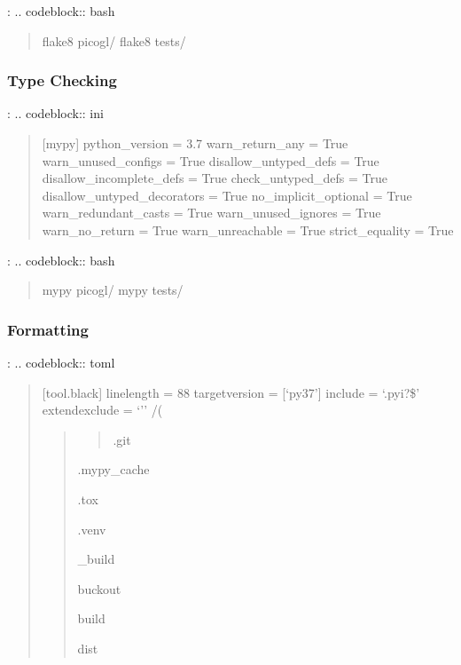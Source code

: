 \documentclass[a4paper,10pt,english,openany,oneside]{sphinxmanual}
\begin{document}
\sphinxAtStartPar
{}:
.. code\sphinxhyphen{}block:: bash
\begin{quote}

\sphinxAtStartPar
flake8 picogl/
flake8 tests/
\end{quote}


\subsubsection{Type Checking}
\label{\detokenize{testing:type-checking}}
\sphinxAtStartPar
{}:
.. code\sphinxhyphen{}block:: ini
\begin{quote}

\sphinxAtStartPar
{[}mypy{]}
python\_version = 3.7
warn\_return\_any = True
warn\_unused\_configs = True
disallow\_untyped\_defs = True
disallow\_incomplete\_defs = True
check\_untyped\_defs = True
disallow\_untyped\_decorators = True
no\_implicit\_optional = True
warn\_redundant\_casts = True
warn\_unused\_ignores = True
warn\_no\_return = True
warn\_unreachable = True
strict\_equality = True
\end{quote}

\sphinxAtStartPar
{}:
.. code\sphinxhyphen{}block:: bash
\begin{quote}

\sphinxAtStartPar
mypy picogl/
mypy tests/
\end{quote}


\subsubsection{Formatting}
\label{\detokenize{testing:formatting}}
\sphinxAtStartPar
{}:
.. code\sphinxhyphen{}block:: toml
\begin{quote}

\sphinxAtStartPar
{[}tool.black{]}
line\sphinxhyphen{}length = 88
target\sphinxhyphen{}version = {[}‘py37’{]}
include = ‘.pyi?\$’
extend\sphinxhyphen{}exclude = ‘’’
/(
\begin{quote}
\begin{quote}

\sphinxAtStartPar
.git
\end{quote}

\begin{DUlineblock}{0em}
\item[] .mypy\_cache
\item[] .tox
\item[] .venv
\item[] \_build
\item[] buck\sphinxhyphen{}out
\item[] build
\item[] dist
\end{DUlineblock}
\end{quote}
\end{quote}
\end{document}
